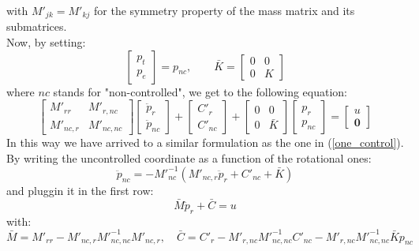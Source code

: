 \documentclass[a4paper,12pt,oneside]{report}
\begin{document}
with $M'_{jk}=M'_{kj}$ for the symmetry property of the mass matrix and its submatrices.\\
Now, by setting:
\begin{equation}
  \begin{bmatrix}
    p_t\\
    p_e
  \end{bmatrix}=p_{nc}, \quad \quad \bar{K}=\begin{bmatrix}
    0&0\\
    0&K
  \end{bmatrix}
\end{equation}
where $nc$ stands for "non-controlled", we get to the following equation:
\begin{equation}
  \begin{bmatrix}
    M'_{rr}&M'_{r,nc}\\
    M'_{nc,r}&M'_{nc,nc}
  \end{bmatrix}\begin{bmatrix}
    \ddot{p}_r\\
    \ddot{p}_{nc}
  \end{bmatrix}+\begin{bmatrix}
    C'_r\\
    C'_{nc}
  \end{bmatrix}+\begin{bmatrix}
    0&0\\
    0&\bar{K}
  \end{bmatrix}\begin{bmatrix}
    p_r\\
    p_{nc}
  \end{bmatrix}=\begin{bmatrix}
    u\\
    \textbf{0}
  \end{bmatrix}
\end{equation}
In this way we have arrived to a similar formulation as the one in (\ref{one_control}). By writing the uncontrolled coordinate as a function of the rotational ones:
\begin{equation}
  \ddot{p}_{nc}=-{M'}_{nc}^{-1}({M'}_{nc,r}\ddot{p}_r+{C'}_{nc}+\bar{K})
\end{equation}
and pluggin it in the first row:
\begin{equation}
  \bar{M}\ddot{p}_r+\bar{C}=u
\end{equation}
with:
\begin{equation}
  \bar{M}=M'_{rr}-M'_{nc,r}{M'}_{nc,nc}^{-1}M'_{nc,r}, \quad \bar{C}=C'_r-M'_{r,nc}{M'}_{nc,nc}^{-1}C'_{nc}-{M'}_{r,nc}{M'}_{nc,nc}^{-1}\bar{K}p_{nc}
\end{equation}
\end{document}
